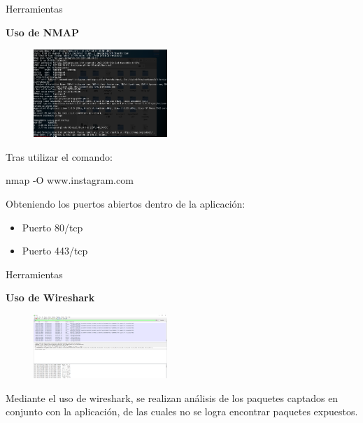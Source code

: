 \begin{frame}[t,fragile]{Herramientas}

\textbf{Uso de NMAP}

\begin{figure} 
\vspace{2pt}
  \begin{center}
    \includegraphics[width=0.45\textwidth]{nmap.png}
    \label{fig:databaseUserTable}
  \end{center}
  \vspace{2pt}
\end{figure} 

\bigskip

 Tras utilizar el comando:
 
 \begin{center}
     nmap -O www.instagram.com 
 \end{center}
 
Obteniendo los puertos abiertos dentro de la aplicación:

\begin{itemize}
    \item Puerto 80/tcp
    \item Puerto 443/tcp
\end{itemize}

\end{frame}

\begin{frame}[t,fragile]{Herramientas}

\textbf{Uso de Wireshark}

\begin{figure} 
\vspace{2pt}
  \begin{center}
    \includegraphics[width=0.45\textwidth]{wireshark.png}
    \label{fig:databaseUserTable}
  \end{center}
  \vspace{2pt}
\end{figure} 

\bigskip

Mediante el uso de wireshark, se realizan análisis de los paquetes captados en conjunto con la aplicación, de las cuales no se logra encontrar paquetes expuestos. 

\end{frame}